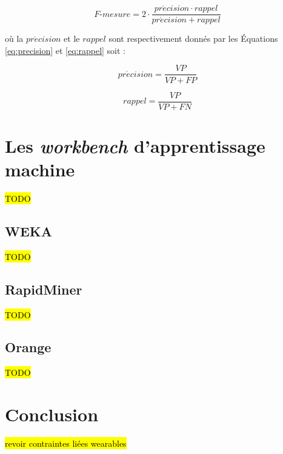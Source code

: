 \begin{equation}
	\label{eq:f-score}
	F\mbox{-} mesure = 2 \cdot \frac{pr\acute{e}cision \cdot rappel}{pr\acute{e}cision + rappel}
\end{equation}

\noindent où la $pr\acute{e}cision$ et le $rappel$ sont respectivement donnés par les Équations \ref{eq:precision} et \ref{eq:rappel} soit :

\begin{equation}
	\label{eq:precision}
	pr\acute{e}cision = \frac{VP}{VP+FP}
\end{equation}

\begin{equation}
	\label{eq:rappel}
	rappel = \frac{VP}{VP+FN}
\end{equation}

\section{Les \textit{workbench} d'apprentissage machine}

\hl{TODO}

\subsection{WEKA}

\hl{TODO}

\subsection{RapidMiner}

\hl{TODO}

\subsection{Orange}

\hl{TODO}

\section{Conclusion}

\hl{revoir contraintes liées wearables}


